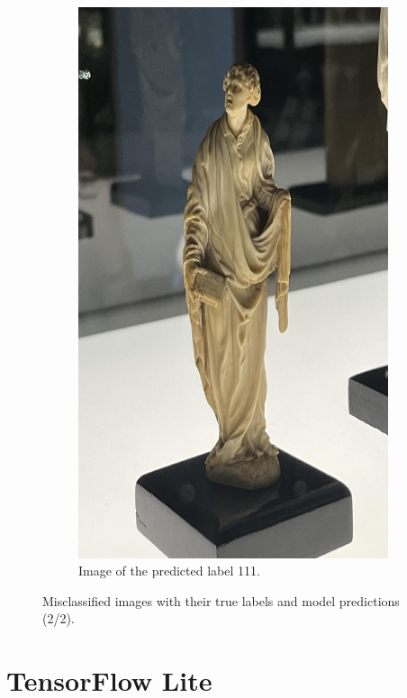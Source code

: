 \begin{figure}[h]
\begin{subfigure}[b]{0.4\textwidth}
        \includegraphics[width=\textwidth]{img/111.jpg}
        \caption{Image of the predicted label 111.}
    \end{subfigure}

    \caption{Misclassified images with their true labels and model predictions (2/2).}\label{fig:misclassifications_examples2}
\end{figure}


\section{TensorFlow Lite}


